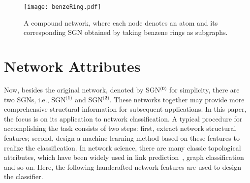 \documentclass[10pt,journal,compsoc]{IEEEtran}
\begin{document}
\begin{figure}[!t]
	\centering
	\texttt{[image: benzeRing.pdf]}
	\caption{A compound network, where each node denotes an atom and its corresponding SGN obtained by taking benzene rings as subgraphs.}
	\label{fig:ben}
\end{figure}

\section{Network Attributes}\label{sec:NA}
Now, besides the original network, denoted by SGN$^{\textbf{(0)}}$ for simplicity, there are two SGNs, i.e., SGN$^{\textbf{(1)}}$ and SGN$^{\textbf{(2)}}$. These networks together may provide more comprehensive structural information for subsequent applications. In this paper, the focus is on its application to network classification. A typical procedure for accomplishing the task consists of two steps: first, extract network structural features; second, design a machine learning method based on these features to realize the classification. In network science, there are many classic topological attributes, which have been widely used in link prediction~\cite{wang2015link}, graph classification~\cite{li2011graph} and so on. Here, the following handcrafted network features are used to design the classifier.
\end{document}
